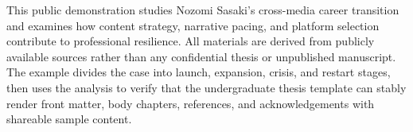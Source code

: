 
This public demonstration studies Nozomi Sasaki's cross-media career transition and examines how content strategy, narrative pacing, and platform selection contribute to professional resilience. All materials are derived from publicly available sources rather than any confidential thesis or unpublished manuscript. The example divides the case into launch, expansion, crisis, and restart stages, then uses the analysis to verify that the undergraduate thesis template can stably render front matter, body chapters, references, and acknowledgements with shareable sample content.

\jxustKeywordsEnLine
